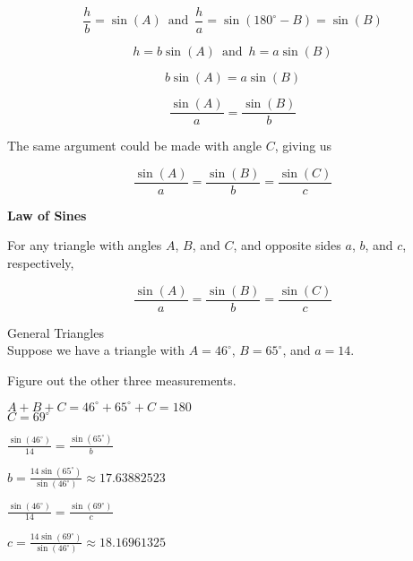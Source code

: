 \documentclass{ximera}
\begin{document}
\[    \frac{h}{b} = \sin(A)   \, \text{ and } \,    \frac{h}{a} = \sin(180^{\circ} - B)  = \sin(B)      \]



\[    h = b \sin(A)      \, \text{ and } \,    h = a \sin(B)    \]

\[     b \sin(A)  = a \sin(B)    \]


\[    \frac{\sin(A)}{a} = \frac{\sin(B)}{b}      \]




The same argument could be made with angle $C$, giving us








\[    \frac{\sin(A)}{a} = \frac{\sin(B)}{b}  = \frac{\sin(C)}{c}    \]






\begin{theorem}  \textbf{\textcolor{green!50!black}{Law of Sines}} 



For any triangle with angles $A$, $B$, and $C$, and opposite sides $a$, $b$, and $c$, respectively, 


\[    \frac{\sin(A)}{a} = \frac{\sin(B)}{b}  = \frac{\sin(C)}{c}    \]


\end{theorem}





\begin{example}  General Triangles \\

Suppose we have a triangle with $A=46^{\circ}$, $B=65^{\circ}$, and $a=14$.

Figure out the other three measurements.


\begin{explanation}

$A + B + C = 46^{\circ} + 65^{\circ} + C = 180$ \\

$C = 69^{\circ}$


$\frac{\sin(46^{\circ})}{14} = \frac{\sin(65^{\circ})}{b}$

$b = \frac{14 \sin(65^{\circ})}{\sin(46^{\circ})} \approx 17.63882523$

$\frac{\sin(46^{\circ})}{14} = \frac{\sin(69^{\circ})}{c}$

$c = \frac{14 \sin(69^{\circ})}{\sin(46^{\circ})} \approx 18.16961325$

\end{explanation}


\end{example}
\end{document}
